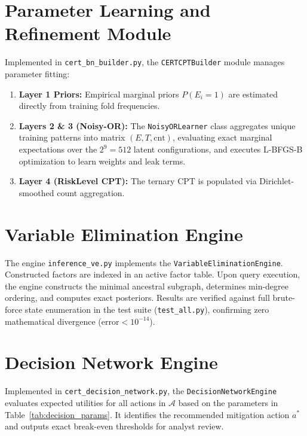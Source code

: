 \documentclass[12pt,a4paper]{report}
\begin{document}
\section{Parameter Learning and Refinement Module}
Implemented in \texttt{cert\_bn\_builder.py}, the \texttt{CERTCPTBuilder} module manages parameter fitting:
\begin{enumerate}
    \item \textbf{Layer 1 Priors:} Empirical marginal priors $P(E_i = 1)$ are estimated directly from training fold frequencies.
    \item \textbf{Layers 2 \& 3 (Noisy-OR):} The \texttt{NoisyORLearner} class aggregates unique training patterns into matrix $(E, T, \text{cnt})$, evaluating exact marginal expectations over the $2^9 = 512$ latent configurations, and executes L-BFGS-B optimization to learn weights and leak terms.
    \item \textbf{Layer 4 (RiskLevel CPT):} The ternary CPT is populated via Dirichlet-smoothed count aggregation.
\end{enumerate}

\section{Variable Elimination Engine}
The engine \texttt{inference\_ve.py} implements the \texttt{VariableEliminationEngine}. Constructed factors are indexed in an active factor table. Upon query execution, the engine constructs the minimal ancestral subgraph, determines min-degree ordering, and computes exact posteriors. Results are verified against full brute-force state enumeration in the test suite (\texttt{test\_all.py}), confirming zero mathematical divergence ($\text{error} < 10^{-14}$).

\section{Decision Network Engine}
Implemented in \texttt{cert\_decision\_network.py}, the \texttt{DecisionNetworkEngine} evaluates expected utilities for all actions in $\mathcal{A}$ based on the parameters in Table~\ref{tab:decision_params}. It identifies the recommended mitigation action $a^*$ and outputs exact break-even thresholds for analyst review.
\end{document}
